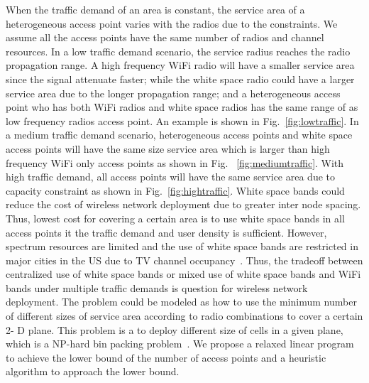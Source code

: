 When the traffic demand of an area is constant, the service area of a heterogeneous access point 
varies with the radios due to the constraints. We assume all the access points have the same number of radios and channel 
resources.
In a low traffic demand scenario, the service radius reaches the radio propagation range.
A high frequency WiFi radio will have a smaller service area since the signal attenuate faster; while the white
space radio could have a larger service area due to the longer propagation range; and a heterogeneous access point who has
both WiFi radios and white space radios has the same range of as low frequency radios access point. An example is
shown in Fig.~\ref{fig:lowtraffic}.
In a medium traffic demand scenario, heterogeneous access points and white space access points will 
have the same size service area which is larger than high frequency WiFi only access points as shown in Fig.
~\ref{fig:mediumtraffic}.
With high traffic demand, all access points will have the same service area due to capacity constraint 
as shown in Fig.~\ref{fig:hightraffic}. White space bands could reduce the cost of wireless network 
deployment due to greater inter node spacing. 
Thus, lowest cost for covering a certain area is to use white space bands in all access points 
it the traffic demand and user density is sufficient. 
However, spectrum resources are limited and the use of white space bands 
are restricted in major cities in the US due to TV channel occupancy~\cite{msdatabase}. 
Thus, the tradeoff between centralized use of  white space bands or mixed use of white space
bands and WiFi bands under multiple traffic demands is question for wireless network deployment. The problem
could be modeled as how to use the minimum number of different sizes of service area according to 
radio combinations to cover a certain 2- D plane. This problem is a to deploy different size of cells in 
a given plane, which is a NP-hard bin packing problem~\cite{martello1998exact}. We propose a relaxed 
linear program to achieve the lower bound of the number of access points and a heuristic algorithm to 
approach the lower bound.



